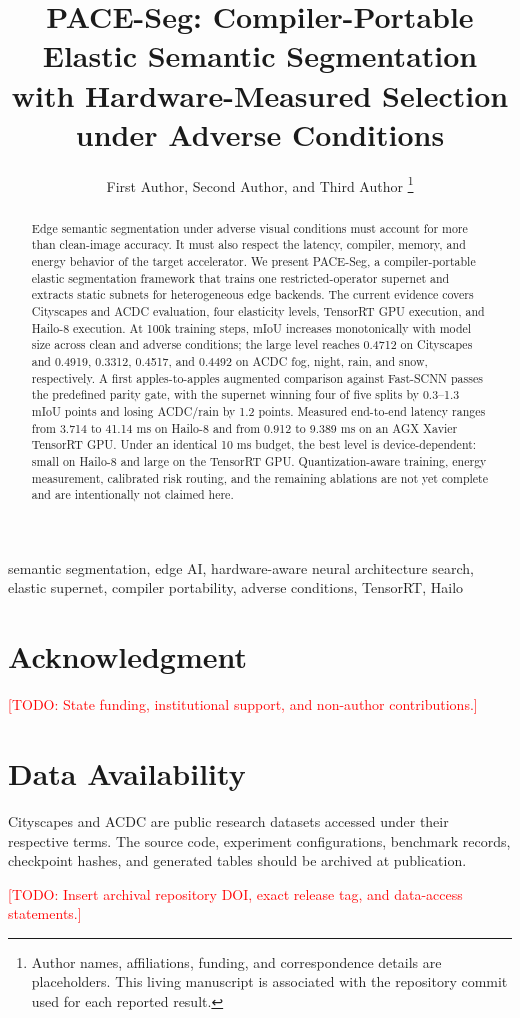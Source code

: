 \documentclass[journal]{IEEEtran}
\title{PACE-Seg: Compiler-Portable Elastic Semantic Segmentation with Hardware-Measured Selection under Adverse Conditions}
\author{First Author, Second Author, and Third Author%
\thanks{Author names, affiliations, funding, and correspondence details are placeholders. This living manuscript is associated with the repository commit used for each reported result.}%
}
\newcommand{\TODO}[1]{\textcolor{red}{[TODO: #1]}}
\newcommand{\method}{PACE-Seg}
\begin{document}
\maketitle

\begin{abstract}
Edge semantic segmentation under adverse visual conditions must account for more than clean-image accuracy. It must also respect the latency, compiler, memory, and energy behavior of the target accelerator. We present \method, a compiler-portable elastic segmentation framework that trains one restricted-operator supernet and extracts static subnets for heterogeneous edge backends. The current evidence covers Cityscapes and ACDC evaluation, four elasticity levels, TensorRT GPU execution, and Hailo-8 execution. At 100k training steps, mIoU increases monotonically with model size across clean and adverse conditions; the large level reaches 0.4712 on Cityscapes and 0.4919, 0.3312, 0.4517, and 0.4492 on ACDC fog, night, rain, and snow, respectively. A first apples-to-apples augmented comparison against Fast-SCNN passes the predefined parity gate, with the supernet winning four of five splits by 0.3--1.3 mIoU points and losing ACDC/rain by 1.2 points. Measured end-to-end latency ranges from 3.714 to 41.14 ms on Hailo-8 and from 0.912 to 9.389 ms on an AGX Xavier TensorRT GPU. Under an identical 10 ms budget, the best level is device-dependent: small on Hailo-8 and large on the TensorRT GPU. Quantization-aware training, energy measurement, calibrated risk routing, and the remaining ablations are not yet complete and are intentionally not claimed here.
\end{abstract}

\begin{IEEEkeywords}
semantic segmentation, edge AI, hardware-aware neural architecture search, elastic supernet, compiler portability, adverse conditions, TensorRT, Hailo
\end{IEEEkeywords}










\section*{Acknowledgment}
\TODO{State funding, institutional support, and non-author contributions.}

\section*{Data Availability}
Cityscapes and ACDC are public research datasets accessed under their respective terms. The source code, experiment configurations, benchmark records, checkpoint hashes, and generated tables should be archived at publication.

\TODO{Insert archival repository DOI, exact release tag, and data-access statements.}



\end{document}
